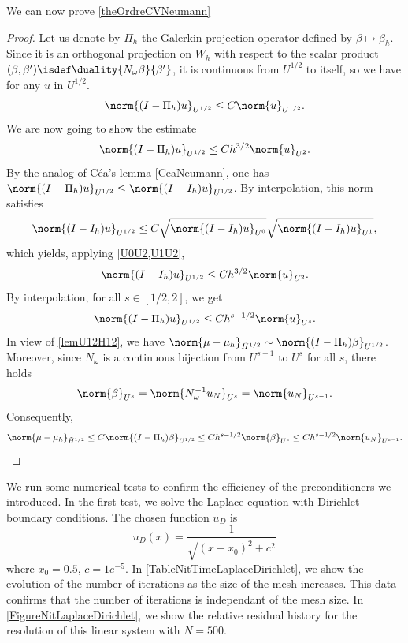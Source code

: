 \documentclass[a4paper]{article}
\begin{document}
	\noindent We can now prove \autoref{theOrdreCVNeumann}
	\begin{proof}
		Let us denote by $\Pi_h$ the Galerkin projection operator defined by $\beta \mapsto \beta_h$. Since it is an orthogonal projection on $W_h$ with respect to the scalar product $(\beta,\beta') \isdef \duality{N_\omega \beta}{\beta'}$, it is continuous from $U^{1/2}$ to itself, so we have for any $u$ in $U^{1/2}$. 
		\[\norm{(I - \Pi_h)u}_{U^{1/2}} \leq C \norm{u}_{U^{1/2}}.\]
		We are now going to show the estimate
		\[\norm{(I - \Pi_h)u}_{U^{1/2}} \leq C h^{3/2} \norm{u}_{U^{2}}.\]
		By the analog of Céa's lemma \autoref{CeaNeumann}, one has $\norm{(I-\Pi_h)u}_{U^{1/2}} \leq \norm{(I - I_h) u}_{U^{1/2}}$. By interpolation, this norm satisfies
		\[\norm{(I - I_h)u}_{U^{1/2}} \leq C \sqrt{\norm{(I - I_h)u}_{U^{0}}}\sqrt{\norm{(I - I_h)u}_{U^{1}}},\]
		which yields, applying \autoref{U0U2,U1U2},
		\[\norm{(I - I_h)u}_{U^{1/2}} \leq C h^{3/2} \norm{u}_{U^2}.\]
		By interpolation, for all $s \in [1/2,2]$, we get
		\[\norm{(I - \Pi_h)u}_{U^{1/2}} \leq C h^{s - 1/2} \norm{u}_{U^s}.\]
		In view of \autoref{lemU12H12}, we have $\norm{\mu - \mu_h}_{\tilde{H}^{1/2}} \sim \norm{(I - \Pi_h)\beta}_{U^{1/2}}$. Moreover, since $N_\omega$ is a continuous bijection from $U^{s+1}$ to $U^s$ for all $s$, there holds
		\[\norm{\beta}_{U^s} = \norm{N_\omega^{-1} u_N}_{U^s} = \norm{u_N}_{U^{s-1}}.\]
		Consequently, 
		\[\norm{\mu - \mu_h}_{\tilde{H}^{1/2}} \leq  C\norm{(I - \Pi_h)\beta}_{U^{1/2}} \leq C h^{s - 1/2} \norm{\beta}_{U^s} \leq C h^{s - 1/2} \norm{u_N}_{U^{s-1}}.\]
	\end{proof}
	
	
	We run some numerical tests to confirm the efficiency of the preconditioners we introduced. In the first test, we solve the Laplace equation with Dirichlet boundary conditions. The chosen function $u_D$ is
	\[u_D(x) = \frac{1}{\sqrt{(x - x_0)^2 + c^2}}\]  
	where $x_0 = 0.5$, $c = 1e^{-5}$. In \autoref{TableNitTimeLaplaceDirichlet}, we show the evolution of the number of iterations as the size of the mesh increases. This data confirms that the number of iterations is independant of the mesh size. In \autoref{FigureNitLaplaceDirichlet}, we show the relative residual history for the resolution of this linear system with $N = 500$. 
	
\end{document}

